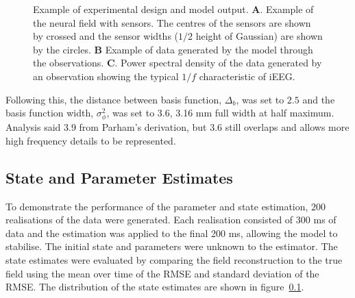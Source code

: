 \documentclass[12pt]{iopart}		%
\begin{document}
\begin{figure}
\begin{center}
	\end{center}
 	\caption{Example of experimental design and model output. \textbf{A}. Example of the neural field with sensors. The centres of the sensors are shown by crossed and the sensor widths ($1/2$ height of Gaussian) are shown by the circles. \textbf{B} Example of data generated by the model through the observations. \textbf{C}. Power spectral density of the data generated by an observation showing the typical $1/f$ characteristic of iEEG.}
 	\label{fig:ExampleFieldAndSensorsDataAndPSD}
 \end{figure}
Following this, the distance between basis function, $\Delta_b$, was set to $2.5$ and the basis function width, $\sigma_{\phi}^2$, was set to 3.6, 3.16 mm full width at half maximum. Analysis said 3.9 from Parham's derivation, but 3.6 still overlaps and allows more high frequency details to be represented.

\subsection{State and Parameter Estimates}
To demonstrate the performance of the parameter and state estimation, $200$ realisations of the data were generated. Each realisation consisted of 300 ms of data and the estimation was applied to the final 200 ms, allowing the model to stabilise. The initial state and parameters were unknown to the estimator. The state estimates were evaluated by comparing the field reconstruction to the true field using the mean over time of the RMSE and standard deviation of the RMSE. The distribution of the state estimates are shown in figure~\ref{}. 
\end{document}
